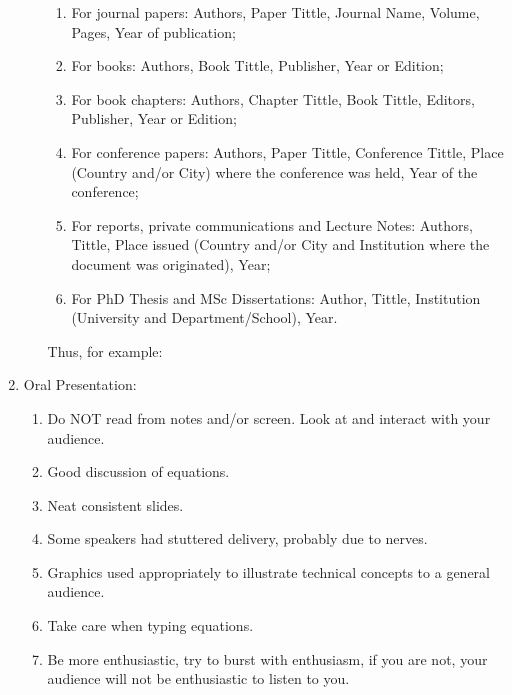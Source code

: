 \documentclass[14pt,twoside]{report}
\begin{document}
\begin{enumerate}
\begin{enumerate}
\begin{enumerate}
\item For journal papers: Authors, Paper Tittle, Journal Name, Volume, Pages, Year of publication;
\item For books: Authors, Book Tittle, Publisher, Year or Edition;
\item For book chapters: Authors, Chapter Tittle, Book Tittle, Editors, Publisher, Year or Edition;
\item For conference papers: Authors, Paper Tittle, Conference Tittle, Place (Country and/or City) where the conference was held, Year of the conference;
\item For reports,  private communications and Lecture Notes: Authors, Tittle, Place issued (Country and/or City and Institution where the document was originated), Year;
\item For PhD Thesis and MSc Dissertations: Author, Tittle, Institution (University and Department/School), Year.
\end{enumerate}  
Thus, for example:
%
\end{enumerate}

\item Oral Presentation:
\begin{enumerate}
%
\item Do NOT read from notes and/or screen. Look at and interact with your audience.
%
\item Good discussion of equations.
%
\item Neat consistent slides.
%
\item Some speakers had stuttered delivery, probably due to nerves.
%
\item Graphics used appropriately to illustrate technical concepts to a general audience.
%
\item Take care when typing equations.
%
\item Be more enthusiastic, try to burst with enthusiasm, if you are not, your audience will not be enthusiastic to listen to you.
%
\end{enumerate}

\end{enumerate}
\end{document}
